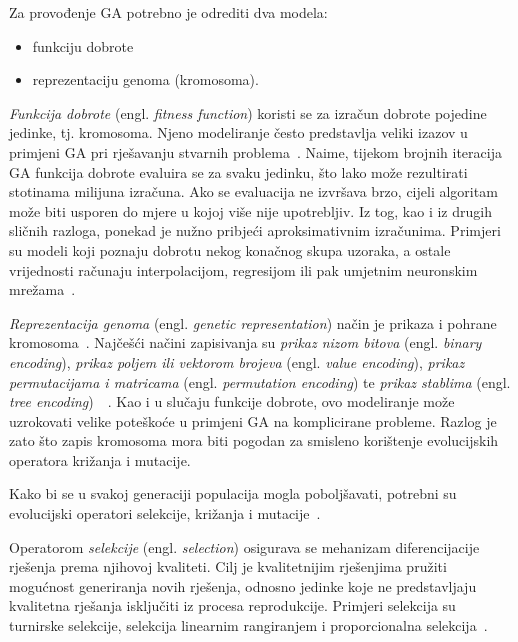 \documentclass[times, utf8, seminar, numeric]{fer}
\begin{document}
Za provođenje GA potrebno je odrediti dva modela:
\begin{itemize}
	\item funkciju dobrote
	\vspace{-1mm}
	\item reprezentaciju genoma (kromosoma).
\end{itemize}
\medskip

\textit{Funkcija dobrote} (engl. \textit{fitness function}) koristi se za izračun dobrote pojedine jedinke, tj. kromosoma.
Njeno modeliranje često predstavlja veliki izazov u primjeni GA pri rješavanju stvarnih problema~\cite{WikiFitness}.
Naime, tijekom brojnih iteracija GA funkcija dobrote evaluira se za svaku jedinku, što lako može rezultirati stotinama milijuna izračuna.
Ako se evaluacija ne izvršava brzo, cijeli algoritam može biti usporen do mjere u kojoj više nije upotrebljiv.
Iz tog, kao i iz drugih sličnih razloga, ponekad je nužno pribjeći aproksimativnim izračunima.
Primjeri su modeli koji poznaju dobrotu nekog konačnog skupa uzoraka, a ostale vrijednosti računaju interpolacijom, regresijom ili pak umjetnim neuronskim mrežama~\cite{WikiFitnessApprox}.

\textit{Reprezentacija genoma} (engl. \textit{genetic representation}) način je prikaza i pohrane kromosoma~\cite{WikiGeneRepres}.
Najčešći načini zapisivanja su \textit{prikaz nizom bitova} (engl. \textit{binary encoding}), \textit{prikaz poljem ili vektorom brojeva} (engl. \textit{value encoding}), \textit{prikaz permutacijama i matricama} (engl. \textit{permutation encoding}) te \textit{prikaz stablima} (engl. \textit{tree encoding})~\cite{Kuthan2007GeneticAI}~\cite{Cupic}.
Kao i u slučaju funkcije dobrote, ovo modeliranje može uzrokovati velike poteškoće u primjeni GA na komplicirane probleme.
Razlog je zato što zapis kromosoma mora biti pogodan za smisleno korištenje evolucijskih operatora križanja i mutacije.

Kako bi se u svakoj generaciji populacija mogla poboljšavati, potrebni su evolucijski operatori selekcije, križanja i mutacije~\cite{Cupic}.

Operatorom \textit{selekcije} (engl. \textit{selection}) osigurava se mehanizam diferencijacije rješenja prema njihovoj kvaliteti.
Cilj je kvalitetnijim rješenjima pružiti mogućnost generiranja novih rješenja, odnosno jedinke koje ne predstavljaju kvalitetna rješanja isključiti iz procesa reprodukcije. 
Primjeri selekcija su turnirske selekcije, selekcija linearnim rangiranjem i proporcionalna selekcija~\cite{Cupic}.
\end{document}
